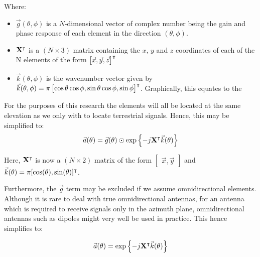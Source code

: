 Where:
\begin{itemize}
  \item \(\vec{g}(\theta, \phi)\) is a \(N\)-dimensional vector of complex number being the gain and phase response  of each element in the direction \((\theta, \phi)\). 
\item \(\mathbf{X}^\intercal\) is a \((N \times 3)\) matrix containing the \(x\), \(y\) and \(z\) coordinates of each of the N elements of the form \(\begin{bmatrix} \vec{x}, \vec{y}, \vec{z} \end{bmatrix}^\intercal\)
\item \(\vec{k}(\theta, \phi)\) is the wavenumber vector given by \(\vec{k}(\theta, \phi) = \pi \begin{bmatrix} \cos\theta\cos\phi, \sin\theta\cos\phi, \sin\phi \end{bmatrix}^\intercal \). Graphically, this equates to the 
\end{itemize}

For the purposes of this research the elements will all be located at the same elevation as we only with to locate terrestrial signals. Hence, this may be simplified to:
\begin{equation}
  \vec{a}(\theta) = \vec{g}(\theta) \odot \exp \left\{ -j \mathbf{X}^\intercal \vec{k}(\theta) \right\}
\end{equation}
    
Here, \(\mathbf{X}^\intercal\) is now a \((N \times 2)\) matrix of the form \(\begin{bmatrix} \vec{x}, \vec{y} \end{bmatrix}\) and \(\vec{k}(\theta) = \pi[\cos(\theta), \sin(\theta)]^\intercal\).

Furthermore, the \(\vec{g}\) term may be excluded if we assume omnidirectional elements. Although it is rare to deal with true omnidirectional antennas, for an antenna which is required to receive signals only in the azimuth plane, omnidirectional antennas such as dipoles might very well be used in practice. This hence simplifies to:

\begin{equation}
  \vec{a}(\theta) = \exp \left\{ -j \mathbf{X}^\intercal \vec{k}(\theta) \right\}
\end{equation}

